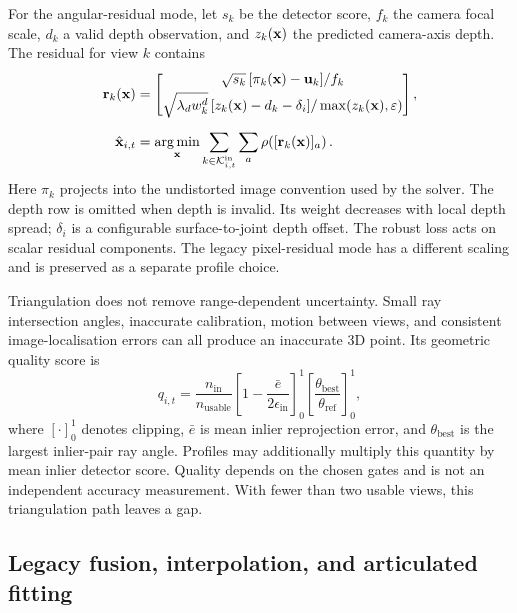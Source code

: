 For the angular-residual mode, let $s_k$ be the detector score, $f_k$ the
camera focal scale, $d_k$ a valid depth observation, and $z_k(\mathbf{x})$ the
predicted camera-axis depth. The residual for view $k$ contains
\begin{equation}
\begin{aligned}
  \mathbf r_k(\mathbf{x})&=
    \begin{bmatrix}
      \sqrt{s_k}\,[\pi_k(\mathbf{x})-\mathbf{u}_k]/f_k\\[1mm]
      \sqrt{\lambda_d w^d_k}\,
        [z_k(\mathbf{x})-d_k-\delta_i]/\max(z_k(\mathbf{x}),\varepsilon)
    \end{bmatrix},\\[2mm]
  \hat{\mathbf{x}}_{i,t}&=\operatorname*{arg\,min}_{\mathbf{x}}
      \sum_{k\in\mathcal K^{\mathrm{in}}_{i,t}}\sum_a
      \rho\!\left([\mathbf r_k(\mathbf{x})]_a\right).
\end{aligned}
  \label{eq:triangulate}
\end{equation}
Here $\pi_k$ projects into the undistorted image convention used by the
solver. The depth row is omitted when depth is invalid. Its weight decreases
with local depth spread; $\delta_i$ is a configurable surface-to-joint
depth offset. The robust loss acts on scalar residual components. The
legacy pixel-residual mode has a different scaling and is preserved as a
separate profile choice.

Triangulation does not remove range-dependent uncertainty. Small ray
intersection angles, inaccurate calibration, motion between views, and
consistent image-localisation errors can all produce an inaccurate 3D
point. Its geometric quality score is
\begin{equation}
  q_{i,t}=\frac{n_{\mathrm{in}}}{n_{\mathrm{usable}}}
    \left[1-\frac{\bar e}{2\epsilon_{\mathrm{in}}}\right]_{0}^{1}
    \left[\frac{\theta_{\mathrm{best}}}{\theta_{\mathrm{ref}}}\right]_{0}^{1},
  \label{eq:quality}
\end{equation}
where $[\cdot]_0^1$ denotes clipping, $\bar e$ is mean inlier reprojection
error, and $\theta_{\mathrm{best}}$ is the largest inlier-pair ray angle.
Profiles may additionally multiply this quantity by mean inlier detector
score. Quality depends on the chosen gates and is not an independent
accuracy measurement. With fewer than two usable views, this triangulation
path leaves a gap.

\subsection{Legacy fusion, interpolation, and articulated fitting}

